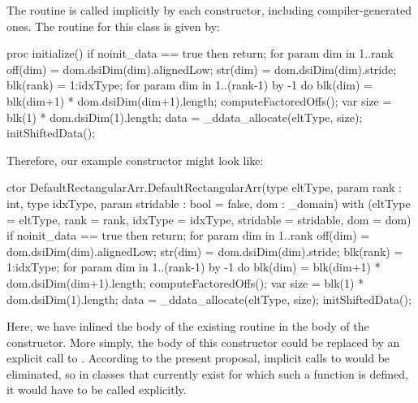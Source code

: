The  routine is called implicitly by each constructor, including
compiler-generated ones.
The  routine for this class is given by:
\begin{chapel}
    proc initialize() {
      if noinit_data == true then return;
      for param dim in 1..rank {
        off(dim) = dom.dsiDim(dim).alignedLow;
        str(dim) = dom.dsiDim(dim).stride;
      }
      blk(rank) = 1:idxType;
      for param dim in 1..(rank-1) by -1 do
        blk(dim) = blk(dim+1) * dom.dsiDim(dim+1).length;
      computeFactoredOffs();
      var size = blk(1) * dom.dsiDim(1).length;
      data = _ddata_allocate(eltType, size);
      initShiftedData();
    }
\end{chapel}

Therefore, our example constructor might look like:
\begin{chapel}
ctor DefaultRectangularArr.DefaultRectangularArr(type eltType,
                                                 param rank : int,
                                                 type idxType,
                                                 param stridable : bool = false,
                                                 dom : _domain)
  with (eltType = eltType, 
        rank = rank, 
        idxType = idxType, 
        stridable = stridable,
        dom = dom) {
    if noinit_data == true then return;
    for param dim in 1..rank {
      off(dim) = dom.dsiDim(dim).alignedLow;
      str(dim) = dom.dsiDim(dim).stride;
    }
    blk(rank) = 1:idxType;
    for param dim in 1..(rank-1) by -1 do
      blk(dim) = blk(dim+1) * dom.dsiDim(dim+1).length;
    computeFactoredOffs();
    var size = blk(1) * dom.dsiDim(1).length;
    data = _ddata_allocate(eltType, size);
    initShiftedData();
}
\end{chapel}
Here, we have inlined the body of the existing  routine in the body of
the constructor.
More simply, the body of this constructor could be replaced by an explicit call to
.  According to the present proposal, implicit calls to
 would be eliminated, so in classes that currently exist for which such
a function is defined, it would have to be called explicitly.

